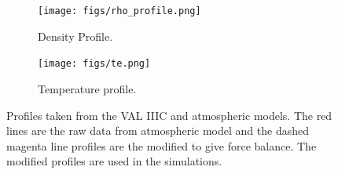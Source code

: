 \documentclass[12pt,a4paper,twoside]{article}
\begin{document}
\begin{figure}[!]
  \centering
  \begin{subfigure}{0.75\textwidth}
    \centering
    \texttt{[image: figs/rho\_profile.png]}
    \caption{Density Profile.}
    \label{rho}
   \end{subfigure}
  \begin{subfigure}{0.75\textwidth}
    \centering
    \texttt{[image: figs/te.png]}
    \caption{Temperature profile.}
    \label{Te}
   \end{subfigure}
\caption{Profiles taken from the VAL IIIC \citep{Vernazza1981} and \cite{McWhirter1975}  atmospheric models. The red lines are the raw data from atmospheric model and the dashed magenta line profiles are the modified to give force balance. The modified profiles are used in the simulations.}
 \label{fig:test}
\end{figure} \\
\end{document}
